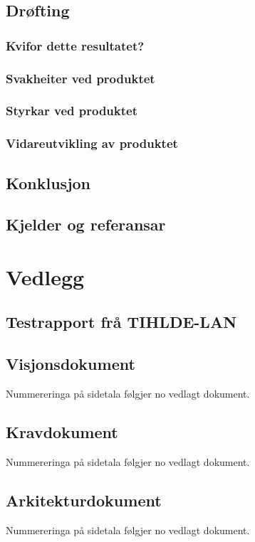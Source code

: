 \documentclass[nynorsk,12pt,a4paper,oneside]{book}
\begin{document}
\chapter{Drøfting}
\section{Kvifor dette resultatet?}
\section{Svakheiter ved produktet}
\section{Styrkar ved produktet}
\section{Vidareutvikling av produktet}
\chapter{Konklusjon}
\chapter{Kjelder og referansar}




\part{Vedlegg}
\appendix 
\chapter{Testrapport frå TIHLDE-LAN}
\chapter{Visjonsdokument}
	Nummereringa på sidetala følgjer no vedlagt dokument.
	
	
\chapter{Kravdokument}
	Nummereringa på sidetala følgjer no vedlagt dokument.
	
\chapter{Arkitekturdokument}
	Nummereringa på sidetala følgjer no vedlagt dokument.
  	
\end{document}

